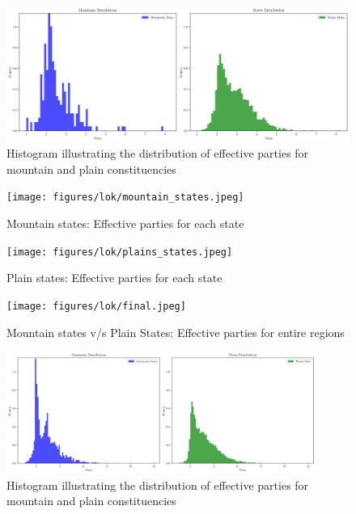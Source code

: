 \begin{figure}[htbp]
    \centering
    \includegraphics[width=1.2\textwidth, bb=0 0 800 800, clip]{figures/lok/histogram.jpeg}
    \caption{Histogram illustrating the distribution of effective parties for mountain and plain constituencies}
    \label{img:histogram}
\end{figure}

\begin{figure}[htbp]
    \centering
    \texttt{[image: figures/lok/mountain\_states.jpeg]}
    \caption{Mountain states: Effective parties for each state}
    \label{img:mountain_enp}
\end{figure}

\begin{figure}[htbp]
    \centering
    \texttt{[image: figures/lok/plains\_states.jpeg]}
    \caption{Plain states: Effective parties for each state}
    \label{img:plain_enp}
\end{figure}

\begin{figure}[htbp]
    \centering
    \texttt{[image: figures/lok/final.jpeg]}
    \caption{Mountain states v/s Plain States: Effective parties for entire regions}
    \label{img:overall_enp}
\end{figure}

\begin{figure}[htbp]
    \centering
    \includegraphics[width=0.9\textwidth, bb=0 0 800 800, clip]{figures/assembly/histogram.jpeg}
    \caption{Histogram illustrating the distribution of effective parties for mountain and plain constituencies}
    \label{img:assembly_histogram}
\end{figure}

